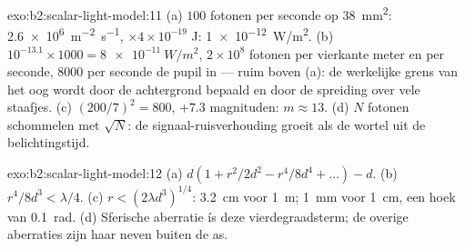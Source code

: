 \begin{solution}{exo:b2:scalar-light-model:11}
(a) $100$ fotonen per seconde op \qty{38}{mm^2}: \qty{2.6e6}{m^{-2}.s^{-1}},
$\times4 \times
10^{-19}$ J: \qty{1e-12}{W/m^2}. (b)
$10^{-13.1} \times 1000 = \qty{8e-11}{W/m^2}$, $2 \times 10^8$ fotonen per
vierkante meter en per seconde, $8000$ per seconde de pupil in --- ruim
boven (a): de werkelijke grens van het oog wordt door de achtergrond bepaald
en door de spreiding over vele staafjes. (c) $(200/7)^2 = 800$, $+7.3$
magnituden: $m \approx
13$. (d) $N$ fotonen schommelen met $\sqrt N$: de
signaal-ruisverhouding groeit als de wortel uit de belichtingstijd.
\end{solution}

\begin{solution}{exo:b2:scalar-light-model:12}
(a) $d(1 + r^2/2d^2 - r^4/8d^4 + \dots) - d$. (b) $r^4/8d^3 < \lambda/4$.
(c) $r <
(2\lambda d^3)^{1/4}$: \qty{3.2}{cm} voor \qty{1}{m}; \qty{1}{mm}
voor \qty{1}{cm}, een hoek van \qty{0.1}{rad}. (d) Sferische aberratie ís
deze vierdegraadsterm; de overige aberraties zijn haar neven buiten de as.
\end{solution}

